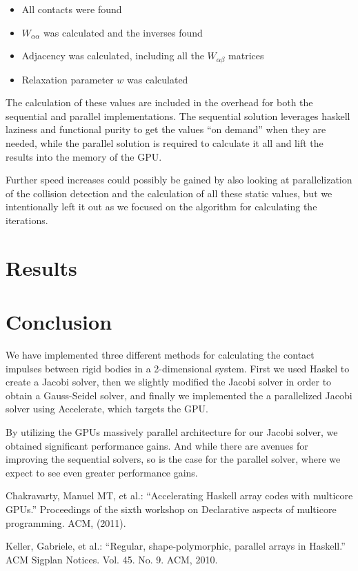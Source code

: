 \documentclass[runningheads,a4paper]{llncs}
\begin{document}
\begin{itemize}
\item All contacts were found
\item $W_{\alpha\alpha}$ was calculated and the inverses found
\item Adjacency was calculated, including all the $W_{\alpha\beta}$ matrices
\item Relaxation parameter $w$ was calculated
\end{itemize}

The calculation of these values are included in the overhead for both
the sequential and parallel implementations.
The sequential solution leverages haskell laziness and functional purity
to get the values ``on demand'' when they are needed,
while the parallel solution is required to calculate it all
and lift the results into the memory of the GPU.

Further speed increases could possibly be gained
by also looking at parallelization of the collision detection
and the calculation of all these static values,
but we intentionally left it out as we focused on the algorithm
for calculating the iterations.

\section{Results}

\section{Conclusion}

We have implemented three different methods for calculating the contact
impulses between rigid bodies in a 2-dimensional system. First we used Haskel
to create a Jacobi solver, then we slightly modified the Jacobi solver in order
to obtain a Gauss-Seidel solver, and finally we implemented the a parallelized
Jacobi solver using Accelerate, which targets the GPU.

By utilizing the GPUs massively parallel architecture for our Jacobi solver, we
obtained significant performance gains. And while there are avenues
for improving the sequential solvers, so is the case for the parallel solver,
where we expect to see even greater performance gains.

\begin{thebibliography}{4}
 Chakravarty, Manuel MT, et al.: ``Accelerating Haskell
  array codes with multicore GPUs.'' Proceedings of the sixth workshop on
  Declarative aspects of multicore programming. ACM, (2011).

 Keller, Gabriele, et al.: ``Regular, shape-polymorphic,
  parallel arrays in Haskell.'' ACM Sigplan Notices. Vol. 45. No. 9. ACM, 2010.
\end{thebibliography}
\end{document}

